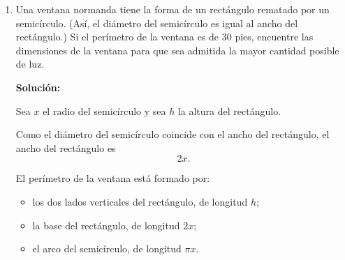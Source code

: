 \documentclass[12pt]{article}
\newcommand{\solucion}{%
    \vspace{0.8em}%
    \textbf{Solución:}%
}
\begin{document}
\begin{enumerate}[label=\alph*.-]
    En consecuencia, en
    \[
    x=\frac12
    \]
    se obtiene el volumen máximo.

    \textbf{Comprobación mediante la segunda derivada}

    Calculamos:
    \[
    V''(x)=-24+24x.
    \]

    Evaluando en $x=\frac12$:
    \[
    V''\left(\frac12\right)
    =
    -24+12
    =
    -12<0.
    \]

    Por lo tanto, $x=\frac12$ corresponde a un máximo.

    \textbf{Dimensiones de la caja}

    La altura es
    \[
    h=x=\frac12\text{ pie}.
    \]

    El lado de la base es
    \[
    3-2x
    =
    3-2\left(\frac12\right)
    =
    2\text{ pies}.
    \]

    Por lo tanto, las dimensiones de la caja son

    \[
    \boxed{
    2\text{ pies}\times2\text{ pies}\times\frac12\text{ pie}
    }.
    \]

    El volumen máximo es

    \[
    V\left(\frac12\right)
    =
    \frac12(3-1)^2
    =
    \frac12(2)^2
    =
    2.
    \]

    Por lo tanto,

    \[
    \boxed{
    V_{\max}=2\text{ pies}^3
    }.
    \]


    \vspace{1cm}

				\newpage

    \setcounter{enumi}{7} %

    \item Una ventana normanda tiene la forma de un rectángulo rematado
    por un semicírculo. (Así, el diámetro del semicírculo es igual al
    ancho del rectángulo.) Si el perímetro de la ventana es de 30 pies,
    encuentre las dimensiones de la ventana para que sea admitida la
    mayor cantidad posible de luz.

    \solucion

    Sea $x$ el radio del semicírculo y sea $h$ la altura del rectángulo.

    Como el diámetro del semicírculo coincide con el ancho del
    rectángulo, el ancho del rectángulo es
    \[
    2x.
    \]

    El perímetro de la ventana está formado por:
    \begin{itemize}
        \item los dos lados verticales del rectángulo, de longitud $h$;
        \item la base del rectángulo, de longitud $2x$;
        \item el arco del semicírculo, de longitud $\pi x$.
    \end{itemize}


\end{enumerate}
\end{document}
